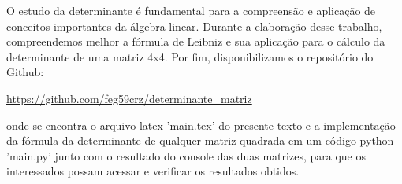 \documentclass[12pt, a4paper]{article}
\begin{document}
O estudo da determinante é fundamental para a compreensão e aplicação de conceitos importantes da álgebra linear. Durante a elaboração desse trabalho, compreendemos melhor a fórmula de Leibniz e sua aplicação para o cálculo da determinante de uma matriz 4x4. Por fim, disponibilizamos o repositório do Github: 
\begin{center}
\url{ https://github.com/feg59crz/determinante_matriz }
\end{center}
onde se encontra o arquivo latex 'main.tex' do presente texto e a implementação da fórmula da determinante de qualquer matriz quadrada em um código python 'main.py' junto com o resultado do console das duas matrizes, para que os interessados possam acessar e verificar os resultados obtidos.
\end{document}
